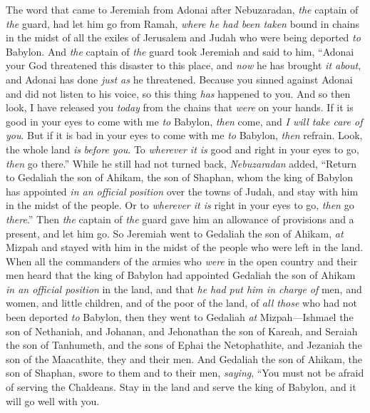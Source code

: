 \begin{biblechapter} %
 The word that came to Jeremiah from Adonai after Nebuzaradan, \textit{the} captain of \textit{the} guard, had let him go from Ramah, \textit{where he had been taken} bound in chains in the midst of all the exiles of Jerusalem and Judah who were being deported \textit{to} Babylon.
\verse And \textit{the} captain of \textit{the} guard took Jeremiah and said to him, “Adonai your God threatened this disaster to this place,
\verse and \textit{now} he has brought \textit{it about}, and Adonai has done \textit{just as} he threatened. Because you sinned against Adonai and did not listen to his voice, so this thing \textit{has} happened to you.
\verse And so then look, I have released you \textit{today} from the chains that \textit{were} on your hands. If it is good in your eyes to come with me \textit{to} Babylon, \textit{then} come, and \textit{I will take care of you}. But if it is bad in your eyes to come with me \textit{to} Babylon, \textit{then} refrain. Look, the whole land \textit{is} \textit{before you}. To \textit{wherever it is} good and right in your eyes to go, \textit{then} go there.”
\verse While he still had not turned back, \textit{Nebuzaradan} added, “Return to Gedaliah the son of Ahikam, the son of Shaphan, whom the king of Babylon has appointed \textit{in an official position} over the towns of Judah, and stay with him in the midst of the people. Or to \textit{wherever it is} right in your eyes to go, \textit{then} go \textit{there}.” Then \textit{the} captain of \textit{the} guard gave him an allowance of provisions and a present, and let him go.
\verse So Jeremiah went to Gedaliah the son of Ahikam, \textit{at} Mizpah and stayed with him in the midst of the people who were left in the land.
 When all the commanders of the armies who \textit{were} in the open country and their men heard that the king of Babylon had appointed Gedaliah the son of Ahikam \textit{in an official position} in the land, and that \textit{he had put him in charge of} men, and women, and little children, and of the poor of the land, of \textit{all those} who had not been deported \textit{to} Babylon,
\verse then they went to Gedaliah \textit{at} Mizpah—Ishmael the son of Nethaniah, and Johanan, and Jehonathan the son of Kareah, and Seraiah the son of Tanhumeth, and the sons of Ephai the Netophathite, and Jezaniah the son of the Maacathite, they and their men.
\verse And Gedaliah the son of Ahikam, the son of Shaphan, swore to them and to their men, \textit{saying}, “You must not be afraid of serving the Chaldeans. Stay in the land and serve the king of Babylon, and it will go well with you.

\end{biblechapter}
